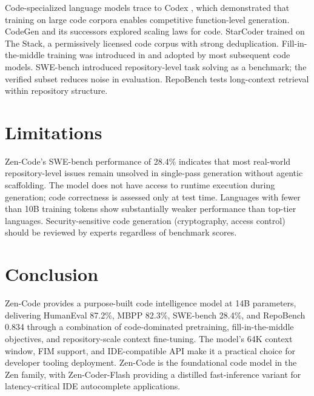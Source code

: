 \documentclass[11pt,a4paper]{article}
\begin{document}
Code-specialized language models trace to Codex \cite{chen2021codex}, which demonstrated
that training on large code corpora enables competitive function-level generation. CodeGen
\cite{nijkamp2023codegen2} and its successors explored scaling laws for code. StarCoder
\cite{li2023starcoder} trained on The Stack, a permissively licensed code corpus with strong
deduplication. Fill-in-the-middle training was introduced in \cite{bavarian2022fim} and
adopted by most subsequent code models. SWE-bench \cite{jimenez2023swe} introduced
repository-level task solving as a benchmark; the verified subset reduces noise in evaluation.
RepoBench \cite{liu2023repobench} tests long-context retrieval within repository structure.

\section{Limitations}

Zen-Code's SWE-bench performance of 28.4\% indicates that most real-world repository-level
issues remain unsolved in single-pass generation without agentic scaffolding. The model does
not have access to runtime execution during generation; code correctness is assessed only at
test time. Languages with fewer than 10B training tokens show substantially weaker performance
than top-tier languages. Security-sensitive code generation (cryptography, access control)
should be reviewed by experts regardless of benchmark scores.

\section{Conclusion}

Zen-Code provides a purpose-built code intelligence model at 14B parameters, delivering
HumanEval 87.2\%, MBPP 82.3\%, SWE-bench 28.4\%, and RepoBench 0.834 through a combination
of code-dominated pretraining, fill-in-the-middle objectives, and repository-scale context
fine-tuning. The model's 64K context window, FIM support, and IDE-compatible API make it
a practical choice for developer tooling deployment. Zen-Code is the foundational code model
in the Zen family, with Zen-Coder-Flash providing a distilled fast-inference variant for
latency-critical IDE autocomplete applications.
\end{document}
